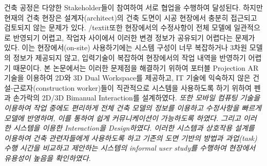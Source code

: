 건축 공정은 다양한 Stakeholder들이 참여하여 서로 협업을 수행하여 달성된다. 하지만 현재의 건축 현장은 설계자(architect)의 건축 도면이 시공 현장에서 충분히 접근되고 검토되지 않는 문제가 있다. /textit{또한 현장에서의 수정사항이 전체 모델에 일관적으로 반영되기 어렵고, 작업자 사이에서 이러한 변경 정보가 공유되기 어렵다는 문제가 있다.} 이는 현장에서(on-site) 사용하기에는 시스템 구성이 너무 복잡하거나 3차원 모델의 정보가 제공되지 않고, 입력기술이 복잡하여 현장에서의 작업 내역을 반영하기 어렵기 때문이다. 본 논문에서는 이러한 문제점을 해결하기 위하여 포터블 Projection AR 기술을 이용하여 2D와 3D Dual Workspace를 제공하고, IT 기술에 익숙하지 않은 건설-근로자(construction worker)들이 직관적으로 시스템을 사용하도록 하기 위하여 펜과 손가락의 2D/3D Bimanual Interaction를 설계하였다. \textit{또한 모바일 컴퓨팅 기술을 이용하여 작업 중에도 편리하게 전체 건축 모델의 정보를 이용하고 수정사항을 빠르게 모델에 반영하며, 이를 통하여 쉽게 커뮤니케이션이 가능하도록 하였다. 그리고 이러한 시스템을 이용한 Interaction을 Design하였다. 이러한 시스템과 상호작용 설계를 이용하여 건축 관련자들에게 사용하도록 하고 기존의 도면 기반의 방법과 과업(task) 수행 시간을 비교하고 제안하는 시스템의 informal user study를 수행하여 현장에서 유용성이 높음을 확인하였다.}